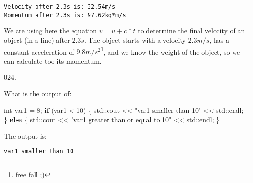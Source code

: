 \documentclass[]{book}
\newenvironment{Shaded}{}{}
\newcommand{\BuiltInTok}[1]{#1}
\newcommand{\ControlFlowTok}[1]{\textcolor[rgb]{0.00,0.44,0.13}{\textbf{#1}}}
\newcommand{\DataTypeTok}[1]{\textcolor[rgb]{0.56,0.13,0.00}{#1}}
\newcommand{\DecValTok}[1]{\textcolor[rgb]{0.25,0.63,0.44}{#1}}
\newcommand{\NormalTok}[1]{#1}
\newcommand{\StringTok}[1]{\textcolor[rgb]{0.25,0.44,0.63}{#1}}
\begin{document}
\begin{minipage}{\linewidth}
\begin{minipage}[t]{.485\linewidth}
\begin{framed}
\begin{verbatim}
Velocity after 2.3s is: 32.54m/s
Momentum after 2.3s is: 97.62kg*m/s
\end{verbatim}

\end{framed}

We are using here the equation \(v = u + a*t\) to determine the final
velocity of an object (in a line) after \(2.3 s\). The object starts
with a velocity \(2.3 m/s\), has a constant acceleration of
\(9.8 m/s^2\)\footnote{free fall ;)}, and we know the weight of the
object, so we can calculate too its momentum.

\end{minipage}
\end{minipage}

\vspace{2mm}\noindent\hrulefill{}

\begin{minipage}{\linewidth}\noindent
{\tiny 024.}\\
\begin{minipage}[t]{.485\linewidth}

What is the output of:

\begin{framed}

\begin{Shaded}
\begin{Highlighting}[]
\DataTypeTok{int}\NormalTok{ var1 = }\DecValTok{8}\NormalTok{;}
\ControlFlowTok{if}\NormalTok{ (var1 < }\DecValTok{10}\NormalTok{) \{}
  \BuiltInTok{std::}\NormalTok{cout << }\StringTok{"var1 smaller than 10"}
\NormalTok{            << }\BuiltInTok{std::}\NormalTok{endl;}
\NormalTok{\} }\ControlFlowTok{else}\NormalTok{ \{}
  \BuiltInTok{std::}\NormalTok{cout}
\NormalTok{    << }\StringTok{"var1 greater than or equal to 10"}
\NormalTok{    << }\BuiltInTok{std::}\NormalTok{endl;}
\NormalTok{\}}
\end{Highlighting}
\end{Shaded}

\end{framed}

\end{minipage}
\hfill
\begin{minipage}[t]{.485\linewidth}

The output is:

\begin{framed}

\begin{verbatim}
var1 smaller than 10
\end{verbatim}

\end{framed}

\end{minipage}
\end{minipage}
\end{document}
